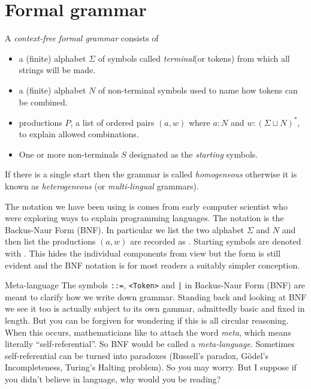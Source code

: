 

\section{Formal grammar}
A \emph{context-free formal grammar} consists of 
\begin{itemize}
    \item {} a (finite) alphabet $\Sigma$ 
    of symbols called \emph{terminal}(or tokens) from which all strings will be made.
    \item {} a (finite) alphabet $N$ of non-terminal symbols
    used to name how tokens can be combined.
    \item {} productions $P$, a list of ordered pairs 
    $(a,w)$ where $a:N$ and $w:(\Sigma\sqcup N)^*$, to explain allowed 
    combinations.
    \item One or more non-terminals $S$ designated as the \emph{starting}
    symbols.
\end{itemize}
If there is a single start then the grammar is called \emph{homogeneous}
otherwise it is known as \emph{heterogeneous} (or \emph{multi-lingual} grammars).

The notation we have been using is comes from early computer
scientist who were exploring ways to explain programming languages. The notation
 is the Backus-Naur Form (BNF). In
particular we list the two alphabet $\Sigma$ and $N$ and then list the
productions $(a,w)$ are recorded as .  Starting symbols are
denoted with .  This hides the individual components from 
view but the form is still evident and the BNF notation is for most readers 
a suitably simpler conception.



\begin{remark}{Meta-language}
    The symbols \lstinline{::=}, \lstinline{<Token>} and \lstinline{|} in
    Backus-Naur Form (BNF) are meant to clarify how we write down grammar.
    Standing back and looking at BNF we see  it too is actually subject to its
    own gammar, admittedly basic and fixed in length.  But you can be forgiven
    for wondering if this is all circular reasoning.  When this occurs,
    mathematicians like to attach the word \emph{meta}, which means literally
    ``self-referential''. So BNF would be called a \emph{meta-language}.
    Sometimes self-referential can be turned into paradoxes (Russell's paradox,
    G\"odel's Incompleteness, Turing's Halting problem).  So you may worry.  But
    I suppose if you didn't believe in language, why would you be reading?\\
\end{remark}


